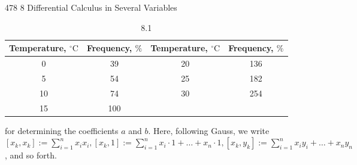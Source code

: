 478
8 Differential Calculus in Several Variables
\begin{table}[h]
    \centering
    \caption{8.1}
    \begin{tabular}{|c|c|c|c|}
    \hline
    Temperature, $^\circ\text{C}$ & Frequency, $\%$ & Temperature, $^\circ\text{C}$ & Frequency, $\%$ \\
    \hline
    0 & 39 & 20 & 136 \\
    5 & 54 & 25 & 182 \\
    10 & 74 & 30 & 254 \\
    15 & 100 & & \\
    \hline
    \end{tabular}
\end{table}
    for determining the coefficients $a$ and $b$. Here, following Gauss, we write $[x_k, x_k] :=
    \sum_{i=1}^n x_i x_i, [x_k, 1] := \sum_{i=1}^n x_i \cdot 1 + \ldots + x_n \cdot 1, [x_k, y_k] := \sum_{i=1}^n x_i y_i + \ldots + x_n y_n$, and
    so forth.
